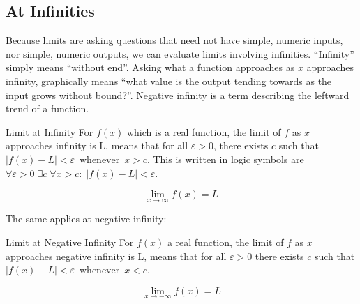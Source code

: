 
\subsection{At Infinities}





Because limits are asking questions that need not have simple, numeric inputs, nor
simple, numeric outputs, we can evaluate limits involving infinities.
``Infinity'' simply means ``without end''.  Asking what a function approaches as
$x$ approaches infinity, graphically means ``what value is the output tending
towards as the input grows without bound?''.  Negative infinity is a term describing
the leftward trend of a function.  


\begin{derivation}{Limit at Infinity}
For $f(x)$ which is a real function, the limit of $f$ as $x$ approaches infinity is L, 
means that for all  $\varepsilon >0$, there exists $c$ such 
that $|f(x) - L| < \varepsilon \, \text{ whenever } \,  x > c$. This is written in logic symbols are
$\forall \varepsilon >  0 \; \exists c \; \forall x > c :\; |f(x) - L| < \varepsilon$.

$$\lim _{x\to \infty }f(x)=L$$

\end{derivation}


The same applies at negative infinity:


\begin{derivation}{Limit at Negative Infinity}
For $f(x)$ a real function, the limit of $f$ as $x$ approaches negative infinity is L, 
means that for all $\varepsilon >0$ there exists $c$ such that 
$ |f(x) - L| < \varepsilon \, \text{ whenever } \, x < c$. 


$$ \lim_{x \to -\infty}f(x) = L$$

\end{derivation}


